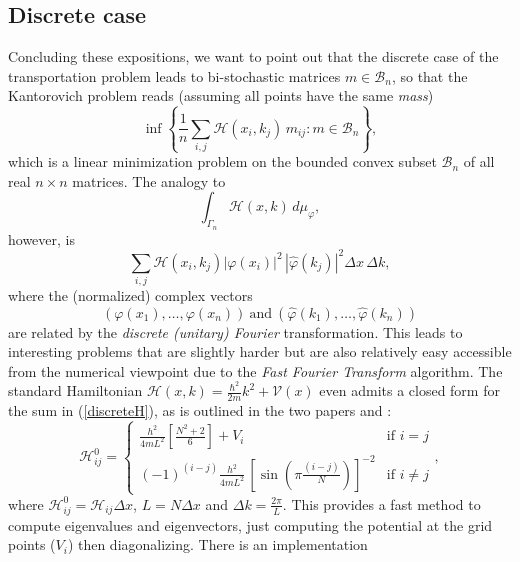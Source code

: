 \documentclass[12pt,a4paper]{article}
\newcommand{\HH}{\mathcal{H}}
\newcommand{\VV}{\mathcal{V}}
\begin{document}
%
\subsection{Discrete case}
Concluding these expositions, we want to point out that the discrete case of 
the transportation problem leads to bi-stochastic matrices $m\in \mathcal{B}_n$, so 
that the Kantorovich problem reads (assuming all points have the same {\sl mass})
\begin{displaymath}
  \inf\left\{ \frac{1}{n}\sum_{i,j} \HH(x_i,k_j) \, m_{ij}: m\in \mathcal{B}_n \right\},
\end{displaymath} 
which is a linear minimization problem on the bounded convex subset $\mathcal{B}_n$
of all real $n\times n$ matrices. The analogy to 
\begin{displaymath}
   \int_{\Gamma_n} \HH(x,k)\, d\mu_\varphi,
\end{displaymath}
however, is
\begin{equation}\label{discreteH}
     \sum_{i,j} \HH(x_i,k_j) |\varphi(x_i)|^2\, |\hat\varphi(k_j)|^2 \Delta x\,\Delta k,
\end{equation}
where the (normalized) complex vectors 
\begin{displaymath}
(\varphi(x_1),\ldots,\varphi(x_n))\ \mathrm{and}\ 
(\hat\varphi(k_1),\ldots,\hat\varphi(k_n)) 
\end{displaymath}
are related by the {\sl discrete (unitary)
Fourier} transformation. This leads to interesting problems  
that are slightly harder but are also relatively easy accessible from the numerical 
viewpoint due to the {\sl Fast Fourier Transform} algorithm. 
The standard Hamiltonian $\HH(x,k)=\frac{\hbar^2}{2m} k^2+\VV(x)$ even admits a 
closed form for the sum in (\ref{discreteH}), as is outlined in the two papers \cite{BalintGrid2} and
\cite{BalintGrid1}:
\begin{equation}\label{balintEq}
\HH_{ij}^0 = \begin{cases} 
  \frac{h^2}{4 m L^2}\left[\frac{N^2+2}{6}\right]+V_i 
    &\mbox{if } i=j \\
    (-1)^{(i-j)} \frac{h^2}{4 m L^2} \, \left[\sin(\pi \frac{(i-j)}{N})\right]^{-2}
    & \mbox{if } i\neq j \end{cases}, 
\end{equation}
where $\HH_{ij}^0 = \HH_{ij} \Delta x$, $L=N \Delta x$ and $\Delta k=\frac{2\pi}{L}$.
This provides a fast method to compute eigenvalues and eigenvectors, just computing
the potential at the grid points ($V_i$) then diagonalizing. There is an implementation
\end{document}
